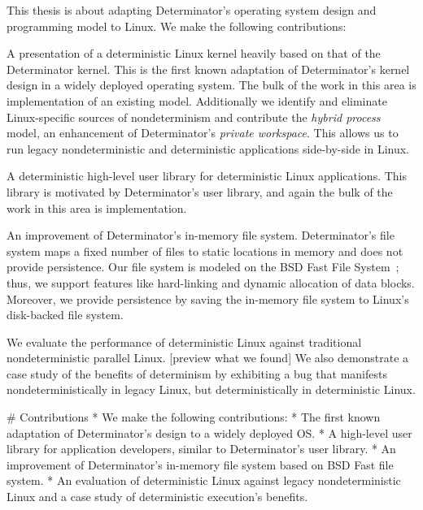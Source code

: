 This thesis is about adapting Determinator's operating system design and
programming model to Linux. We make the following contributions:
\begin{myitemize4}
    \item A presentation of a deterministic Linux kernel heavily based on that
    of the Determinator kernel. This is the first known adaptation of
    Determinator's kernel design in a widely deployed operating system.
    The bulk of the work in this area is implementation of an existing model.
    Additionally we identify and eliminate Linux-specific sources of
    nondeterminism and contribute the \emph{hybrid process} model, an
    enhancement of Determinator's \emph{private workspace}. This allows
    us to run legacy nondeterministic and deterministic applications
    side-by-side in Linux.
    \item A deterministic high-level user library for deterministic Linux
    applications. This library is motivated by Determinator's user library, and
    again the bulk of the work in this area is implementation.
    \item An improvement of Determinator's in-memory file system.
    Determinator's file system maps a fixed number of files to static locations
    in memory and does not provide persistence. Our file system is modeled on
    the BSD Fast File System~\cite{mckusick1984fast}; thus, we support features
    like hard-linking and dynamic allocation of data blocks. Moreover, we
    provide persistence by saving the in-memory file system to Linux's
    disk-backed file system.
    \item We evaluate the performance of deterministic Linux against traditional
    nondeterministic parallel Linux. [preview what we found] We also demonstrate
    a case study of the benefits of determinism by exhibiting a bug that
    manifests nondeterministically in legacy Linux, but deterministically in
    deterministic Linux.
\end{myitemize4}

\iffalse

# Contributions
* We make the following contributions:
* The first known adaptation of Determinator's design to a widely deployed OS.
* A high-level user library for application developers, similar to
  Determinator's user library.
* An improvement of Determinator's in-memory file system based on BSD Fast
  file system.
* An evaluation of deterministic Linux against legacy nondeterministic Linux and
  a case study of deterministic execution's benefits.

